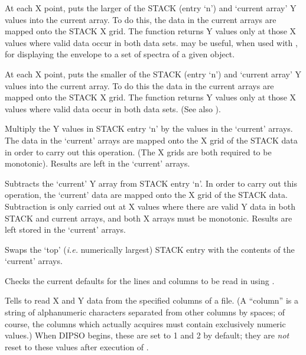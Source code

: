 \begin {description}
At each X point, puts the larger of the STACK (entry `n') and `current
array' Y values into the current array. To do this, the data in the
current arrays are mapped onto the STACK X grid. The function returns
Y values only at those X values where valid data occur in both
data sets.   may be useful, when used with ,  for displaying the
envelope to a set of spectra of a given object.

At each X point, puts the smaller of the STACK (entry `n') and
`current array' Y values into the current array. To do this the data
in the current arrays are mapped onto the STACK X grid. The function
returns Y values only at those X values where valid data occur in both
data sets. (See also ). 

Multiply the Y values in STACK entry `n' by the values in the
`current' arrays. The data in the `current' arrays are mapped onto the
X grid of the STACK data in order to carry out this operation. (The X
grids are both required to be monotonic). Results are left in the
`current' arrays.

Subtracts the `current' Y array from STACK entry `n'. In order to
carry out this operation, the `current' data are mapped onto the X
grid of the STACK data. Subtraction is only carried out at X values
where there are valid Y data in both STACK and current arrays, and
both X arrays must be monotonic. Results are left stored in the
`current' arrays.

Swaps the `top' ({\em i.e.} numerically largest) STACK entry with the
contents of the `current' arrays.

Checks the current defaults for the lines and columns to be read in
using . 

Tells   to read X and Y data from the specified columns of a
file. (A ``column'' is a string of alphanumeric characters separated
from other columns by spaces; of course, the columns which  
actually acquires must contain exclusively numeric values.) When DIPSO
begins, these are set to 1 and 2 by default; they are {\em not} reset
to these values after execution of . 


\end{description}
